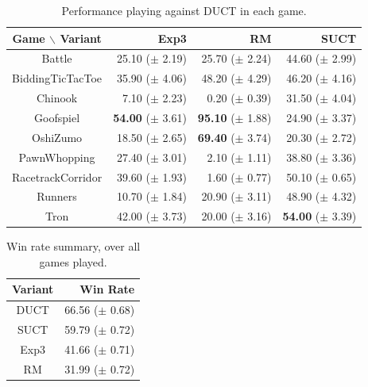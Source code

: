 \documentclass[conference]{IEEEtran}
\begin{document}
\begin{table}
\begin{center}
\begin{tabular}{|c|rrr|}
\hline
 Game $\backslash$ Variant    & Exp3		 & RM		 & SUCT		\\ 
\hline
                   Battle     & 25.10 ($\pm$ 2.19)	& 25.70 ($\pm$ 2.24)	& 44.60 ($\pm$ 2.99)	\\ 
         BiddingTicTacToe     & 35.90 ($\pm$ 4.06)	& 48.20 ($\pm$ 4.29)	& 46.20 ($\pm$ 4.16)	\\ 
                  Chinook     & 7.10 ($\pm$ 2.23)	  & 0.20 ($\pm$ 0.39)	  & 31.50 ($\pm$ 4.04)	\\ 
                Goofspiel     & {\bf 54.00} ($\pm$ 3.61)	& {\bf 95.10} ($\pm$ 1.88)	& 24.90 ($\pm$ 3.37)	\\ 
                 OshiZumo     & 18.50 ($\pm$ 2.65)	& {\bf 69.40} ($\pm$ 3.74)	& 20.30 ($\pm$ 2.72)	\\ 
             PawnWhopping     & 27.40 ($\pm$ 3.01)	& 2.10 ($\pm$ 1.11)	& 38.80 ($\pm$ 3.36)	\\ 
        RacetrackCorridor     & 39.60 ($\pm$ 1.93)	& 1.60 ($\pm$ 0.77)	& 50.10 ($\pm$ 0.65)	\\ 
                  Runners     & 10.70 ($\pm$ 1.84)	& 20.90 ($\pm$ 3.11)	& 48.90 ($\pm$ 4.32)	\\ 
                     Tron     & 42.00 ($\pm$ 3.73)	& 20.00 ($\pm$ 3.16)	& {\bf 54.00} ($\pm$ 3.39)	\\ 
\hline
\end{tabular}
\end{center}
\caption{Performance playing against DUCT in each game. \label{tbl:vsduct}}
\end{table}


\begin{table}
\begin{center}
\begin{tabular}{|c|r|}
\hline
Variant     & Win Rate \\
\hline
      DUCT  &   66.56 ($\pm$ 0.68) \\
      SUCT  &   59.79 ($\pm$ 0.72) \\
      Exp3  &   41.66 ($\pm$ 0.71) \\
        RM  &   31.99 ($\pm$ 0.72) \\
\hline
\end{tabular}
\end{center}
\caption{Win rate summary, over all games played. \label{tbl:summary}}
\end{table}
\end{document}
